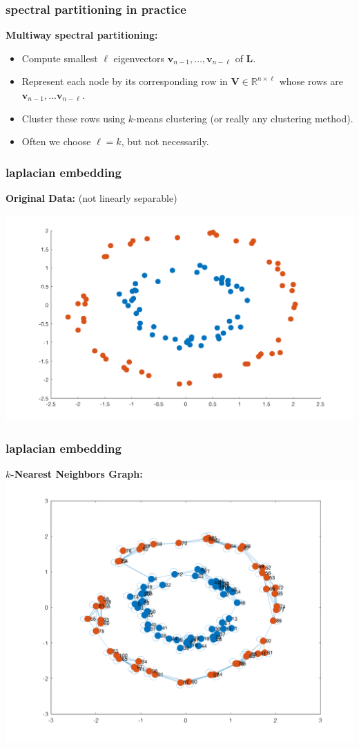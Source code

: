 \documentclass[compress]{beamer}
\newcommand{\bv}[1]{\mathbf{#1}}
\newcommand{\R}{\mathbb{R}}
\begin{document}
\begin{frame}
	\frametitle{spectral partitioning in practice}
	\textbf{Multiway spectral partitioning:}
	\begin{itemize}
		\item Compute smallest $\ell$ eigenvectors $\bv{v}_{n-1}, \ldots, \bv{v}_{n-\ell}$ of $\mathbf{L}$.
		\item Represent each node by its corresponding row in $\bv{V} \in \R^{n \times \ell}$ whose rows are  $\bv{v}_{n-1}, \ldots \bv{v}_{n-\ell}$.
		\item Cluster these rows using $k$-means clustering (or really any clustering method).
		\item Often we choose $\ell = k$, but not necessarily. 
	\end{itemize}
\end{frame}

\begin{frame}
	\frametitle{laplacian embedding}
	\begin{center}
		\textbf{Original Data:} (not linearly separable)
			
			\includegraphics[width=.7\textwidth]{circ.png}
	\end{center}
\end{frame}

\begin{frame}
	\frametitle{laplacian embedding}
	\begin{center}
			\textbf{$k$-Nearest Neighbors Graph:}
			\includegraphics[width=.7\textwidth]{circ2.png}
	\end{center}
\end{frame}
\end{document}
